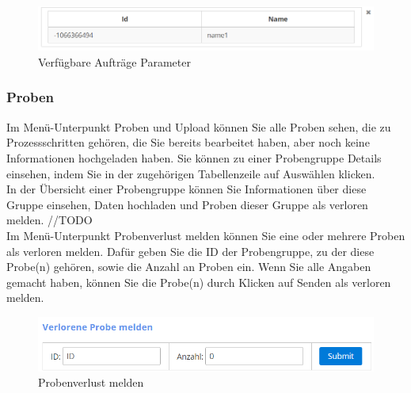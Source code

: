 \documentclass[enabledeprecatedfontcommands,fontsize=12pt,paper=a4,twoside]{scrartcl}
\begin{document}
\begin{figure}[h!]
\begin{center}
 \includegraphics[width=\textwidth]{screenshots/t/verfugbareauftrageparameter.png}
  \caption{Verfügbare Aufträge Parameter}
  \label{fig:boat1}
\end{center}
\end{figure}



\subsubsection{Proben}
Im Menü-Unterpunkt Proben und Upload können Sie alle Proben sehen, die zu Prozessschritten gehören, die Sie bereits bearbeitet haben, aber noch keine Informationen hochgeladen haben. Sie können zu einer Probengruppe Details einsehen, indem Sie in der zugehörigen Tabellenzeile auf Auswählen klicken.\\

In der Übersicht einer Probengruppe können Sie Informationen über diese Gruppe einsehen, Daten hochladen und Proben dieser Gruppe als verloren melden. //TODO \\

Im Menü-Unterpunkt Probenverlust melden können Sie eine oder mehrere Proben als verloren melden. Dafür geben Sie die ID der Probengruppe, zu der diese Probe(n) gehören, sowie die Anzahl an Proben ein. Wenn Sie alle Angaben gemacht haben, können Sie die Probe(n) durch Klicken auf Senden als verloren melden. \\

\begin{figure}[h!]
\begin{center}
 \includegraphics[width=\textwidth]{screenshots/t/probemelden.png}
  \caption{Probenverlust melden}
  \label{fig:boat1}
\end{center}
\end{figure}
\end{document}

